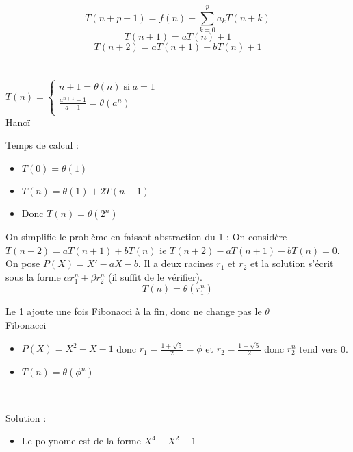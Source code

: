  $$T(n+ p + 1) = f(n) + \displaystyle{\sum_{k=0}^{p}} a_kT(n+k)$$
	$$T(n+1) = aT(n) + 1$$
	$$T(n+2) = aT(n+1) + bT(n) + 1$$ \\

 \\

	$T(n) = \left\{ \begin{array}{c}
		n + 1 = \theta(n)\; \mathrm{si} \; a = 1 \\
		\frac{a^{n+1} - 1}{a - 1} = \theta(a^n) \\
	\end{array} \right.$ \\

 Hanoï \\

Temps de calcul :
\begin{itemize}
	\item $T(0) = \theta(1)$
	\item $T(n) = \theta(1) + 2T(n-1)$
	\item Donc $T(n) = \theta(2^n)$
\end{itemize}

 On simplifie le problème en faisant abstraction du 1 : On considère $T(n+2) = aT(n+1) + bT(n)$ ie $T(n+2) - aT(n+1) - bT(n) = 0$. \\
On pose $P(X) = X' - aX - b$. Il a deux racines $r_1$ et $r_2$ et la solution s'écrit sous la forme $\alpha r_1^n + \beta r_2^n$ (il suffit de le vérifier). \\
$$T(n) = \theta(r_1^n)$$

 Le 1 ajoute une fois Fibonacci à la fin, donc ne change pas le $\theta$ \\

 Fibonacci 
\begin{itemize}
	\item $P(X) = X^2 - X - 1$ donc $r_1 = \frac{1 + \sqrt{5}}{2} = \phi$ et $r_2 = \frac{1 - \sqrt{5}}{2}$ donc $r_2^n$ tend vers 0.
	\item $T(n) = \theta(\phi^n)$
\end{itemize}

 \\

Solution :
\begin{itemize} 
	\item Le polynome est de la forme $X^4 - X^2 - 1$
\end{itemize}
